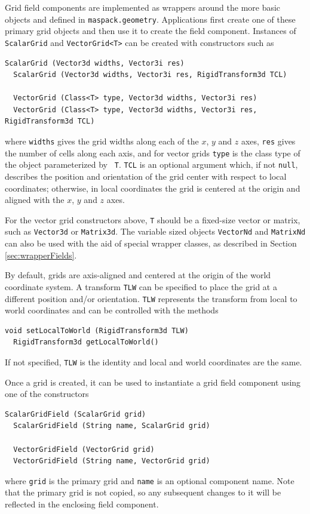 Grid field components are implemented as wrappers around the more
basic objects  and
 defined in
{\tt maspack.geometry}. Applications first create one of these primary
grid objects and then use it to create the field component.  Instances
of {\tt ScalarGrid} and {\tt VectorGrid<T>} can be created with
constructors such as
%
\begin{lstlisting}[]
  ScalarGrid (Vector3d widths, Vector3i res)
  ScalarGrid (Vector3d widths, Vector3i res, RigidTransform3d TCL)

  VectorGrid (Class<T> type, Vector3d widths, Vector3i res)
  VectorGrid (Class<T> type, Vector3d widths, Vector3i res, RigidTransform3d TCL)
\end{lstlisting}
%
where {\tt widths} gives the grid widths along each of the $x$, $y$
and $z$ axes, {\tt res} gives the number of cells along each axis, and
for vector grids {\tt type} is the class type of the
 object parameterized by {\tt
T}.  {\tt TCL} is an optional argument which, if not {\tt null},
describes the position and orientation of the grid center with respect
to local coordinates; otherwise, in local coordinates the grid is
centered at the origin and aligned with the $x$, $y$ and $z$ axes.

\begin{sideblock}
For the vector grid constructors above, {\tt T} should be a fixed-size
vector or matrix, such as {\tt Vector3d} or {\tt Matrix3d}.  The
variable sized objects {\tt VectorNd} and {\tt MatrixNd} can also be
used with the aid of special wrapper classes, as described in Section
\ref{sec:wrapperFields}.
\end{sideblock}

By default, grids are axis-aligned and centered at the origin of the
world coordinate system. A transform {\tt TLW} can be specified to
place the grid at a different position and/or orientation.  {\tt TLW}
represents the transform from local to world coordinates and can be
controlled with the methods
%
\begin{lstlisting}[]
  void setLocalToWorld (RigidTransform3d TLW)
  RigidTransform3d getLocalToWorld()
\end{lstlisting}
%
If not specified, {\tt TLW} is the identity and local and world
coordinates are the same.

Once a grid is created, it can be used to instantiate a grid field
component using one of the constructors
%
\begin{lstlisting}[]
  ScalarGridField (ScalarGrid grid)
  ScalarGridField (String name, ScalarGrid grid)

  VectorGridField (VectorGrid grid)
  VectorGridField (String name, VectorGrid grid)
\end{lstlisting}
%
where {\tt grid} is the primary grid and {\tt name} is an optional
component name. Note that the primary grid is not copied, so any
subsequent changes to it will be reflected in the enclosing field
component.

